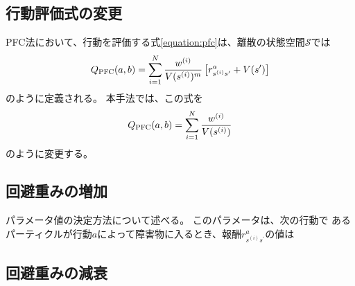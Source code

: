 \subsection{行動評価式の変更}
PFC法において、行動を評価する式\ref{equation:pfc}は、離散の状態空間$\mathcal{S}$では
\begin{equation}
\label{equation:finite pfc}
  Q_{\rm PFC}(a, b) = \sum_{i=1}^{N} \frac{ w^{(i)} }{ V(s^{(i)})^{m} }
                      \left[r^{a}_{s^{(i)} s^{\prime}} + V(s^{\prime}) \right]
\end{equation}
のように定義される。
本手法では、この式を
\begin{equation}
\label{equation:modified pfc}
  Q_{\rm PFC}(a, b) = \sum_{i=1}^{N} \frac{w^{(i)}}{V(s^{(i)})}
\end{equation}
のように変更する。

\subsection{回避重みの増加}
パラメータ値の決定方法について述べる。
このパラメータは、次の行動で
あるパーティクルが行動$a$によって障害物に入るとき、報酬$r^{a}_{s^{(i)}s^{\prime}}$の値は


\subsection{回避重みの減衰}
